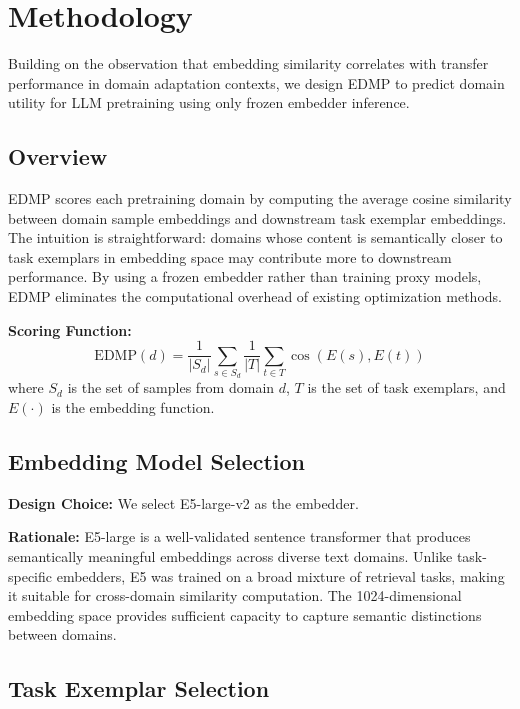 \section{Methodology}
\label{sec:method}

Building on the observation that embedding similarity correlates with transfer performance in domain adaptation contexts, we design EDMP to predict domain utility for LLM pretraining using only frozen embedder inference.

\subsection{Overview}

EDMP scores each pretraining domain by computing the average cosine similarity between domain sample embeddings and downstream task exemplar embeddings. The intuition is straightforward: domains whose content is semantically closer to task exemplars in embedding space may contribute more to downstream performance. By using a frozen embedder rather than training proxy models, EDMP eliminates the computational overhead of existing optimization methods.

\textbf{Scoring Function:}
\begin{equation}
\text{EDMP}(d) = \frac{1}{|S_d|} \sum_{s \in S_d} \frac{1}{|T|} \sum_{t \in T} \cos(E(s), E(t))
\end{equation}
where $S_d$ is the set of samples from domain $d$, $T$ is the set of task exemplars, and $E(\cdot)$ is the embedding function.

\subsection{Embedding Model Selection}

\textbf{Design Choice:} We select E5-large-v2 \cite{wang2022text} as the embedder.

\textbf{Rationale:} E5-large is a well-validated sentence transformer that produces semantically meaningful embeddings across diverse text domains. Unlike task-specific embedders, E5 was trained on a broad mixture of retrieval tasks, making it suitable for cross-domain similarity computation. The 1024-dimensional embedding space provides sufficient capacity to capture semantic distinctions between domains.

\subsection{Task Exemplar Selection}

